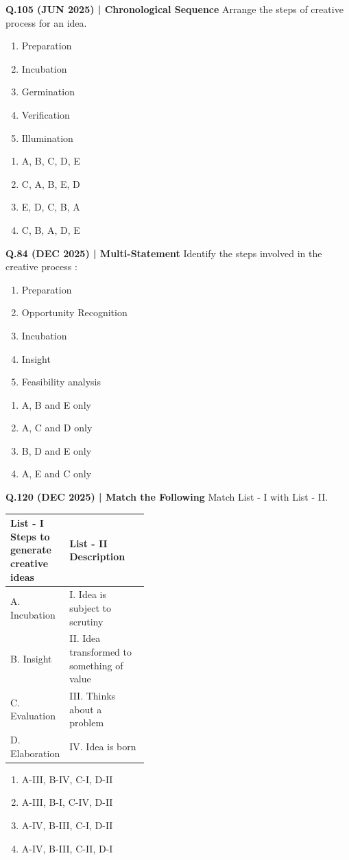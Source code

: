 \documentclass{article}
\begin{document}
\textbf{Q.105 (JUN 2025) | Chronological Sequence}
Arrange the steps of creative process for an idea.
\begin{enumerate}[label=\Alph*.]
    \item Preparation
    \item Incubation
    \item Germination
    \item Verification
    \item Illumination
\end{enumerate}
\begin{enumerate}[label=(\arabic*)]
    \item A, B, C, D, E
    \item C, A, B, E, D
    \item E, D, C, B, A
    \item C, B, A, D, E
\end{enumerate}

\textbf{Q.84 (DEC 2025) | Multi-Statement}
Identify the steps involved in the creative process :
\begin{enumerate}[label=\Alph*.]
    \item Preparation
    \item Opportunity Recognition
    \item Incubation
    \item Insight
    \item Feasibility analysis
\end{enumerate}
\begin{enumerate}[label=(\arabic*)]
    \item A, B and E only
    \item A, C and D only
    \item B, D and E only
    \item A, E and C only
\end{enumerate}

\textbf{Q.120 (DEC 2025) | Match the Following}
Match List - I with List - II.
\begin{tabularx}{\linewidth}{@{} p{0.4\linewidth} X @{}}
    \toprule
    \textbf{List - I Steps to generate creative ideas} & \textbf{List - II Description} \\
    \midrule
    A. Incubation & I. Idea is subject to scrutiny \\
    B. Insight & II. Idea transformed to something of value \\
    C. Evaluation & III. Thinks about a problem \\
    D. Elaboration & IV. Idea is born \\
    \bottomrule
\end{tabularx}
\begin{enumerate}[label=(\arabic*)]
    \item A-III, B-IV, C-I, D-II
    \item A-III, B-I, C-IV, D-II
    \item A-IV, B-III, C-I, D-II
    \item A-IV, B-III, C-II, D-I
\end{enumerate}
\end{document}
